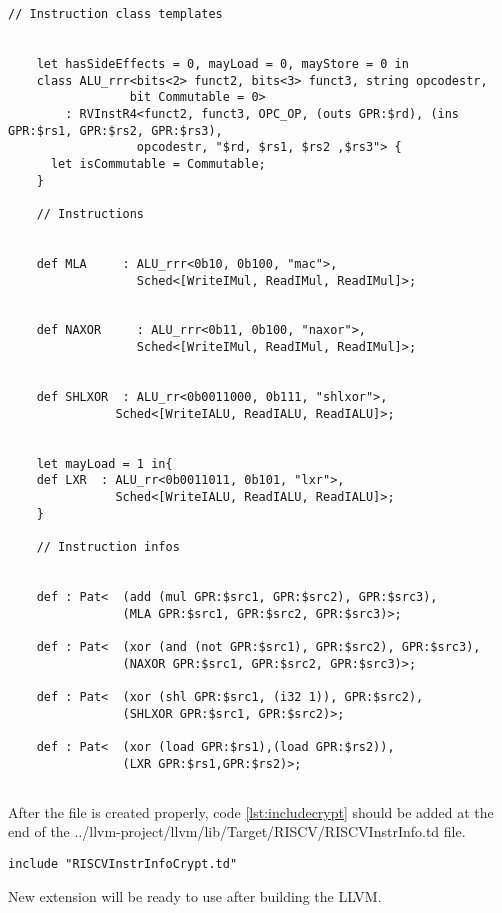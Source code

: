 \begin{lstlisting}[caption={RISCVInstrInfoCrypt.td file},label={lst:crypt_file}]
	// Instruction class templates
	

	let hasSideEffects = 0, mayLoad = 0, mayStore = 0 in
	class ALU_rrr<bits<2> funct2, bits<3> funct3, string opcodestr,
				 bit Commutable = 0>
		: RVInstR4<funct2, funct3, OPC_OP, (outs GPR:$rd), (ins GPR:$rs1, GPR:$rs2, GPR:$rs3),
				  opcodestr, "$rd, $rs1, $rs2 ,$rs3"> {
	  let isCommutable = Commutable;
	}
	
	// Instructions
	
	
	def MLA     : ALU_rrr<0b10, 0b100, "mac">,
				  Sched<[WriteIMul, ReadIMul, ReadIMul]>;
	
	
	def NAXOR     : ALU_rrr<0b11, 0b100, "naxor">,
				  Sched<[WriteIMul, ReadIMul, ReadIMul]>;
	
	
	def SHLXOR  : ALU_rr<0b0011000, 0b111, "shlxor">,
			   Sched<[WriteIALU, ReadIALU, ReadIALU]>;
	
	
	let mayLoad = 1 in{
	def LXR  : ALU_rr<0b0011011, 0b101, "lxr">,
			   Sched<[WriteIALU, ReadIALU, ReadIALU]>;
	}
	
	// Instruction infos
	
	
	def : Pat<  (add (mul GPR:$src1, GPR:$src2), GPR:$src3),
				(MLA GPR:$src1, GPR:$src2, GPR:$src3)>;
	
	def : Pat<  (xor (and (not GPR:$src1), GPR:$src2), GPR:$src3),
				(NAXOR GPR:$src1, GPR:$src2, GPR:$src3)>;
	
	def : Pat<  (xor (shl GPR:$src1, (i32 1)), GPR:$src2),
				(SHLXOR GPR:$src1, GPR:$src2)>;
	
	def : Pat<  (xor (load GPR:$rs1),(load GPR:$rs2)),
				(LXR GPR:$rs1,GPR:$rs2)>;
	
\end{lstlisting}

After the file is created properly, code \ref{lst:includecrypt} should be added at the end of the ../llvm-project/llvm/lib/Target/RISCV/RISCVInstrInfo.td file.
\begin{lstlisting}[caption={Include line},label={lst:includecrypt}]
include "RISCVInstrInfoCrypt.td"
\end{lstlisting}
New extension will be ready to use after building the LLVM.
\newpage
